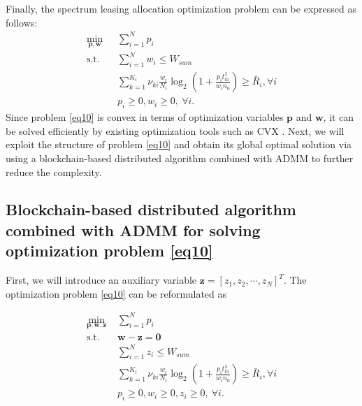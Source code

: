 \documentclass[journal]{IEEEtran}
\begin{document}
Finally, the spectrum leasing allocation optimization problem can be expressed as follows:
\begin{subequations}\label{eq10}
	\begin{align}
	\min_{\mathbf{p}, \mathbf{w}}\ & \sum\limits_{i = 1}^{N} p_i \label{q10a} \\ \mbox{s.t.} \quad &  \sum\limits_{i = 1}^{N} w_i \leq W_{sum} \label{q10b} \\ \quad &  \sum\limits_{k = 1}^{K_i}\nu_{ki}\frac{w_i}{N_i}\log_2\left(1 + \frac{p_it_{ki}^2}{w_in_0}\right) \geq \bar{R}_i, \forall i \label{q10c}\\
	& p_i \geq 0, w_i \geq 0, \ \forall i. \label{q10d}
	\end{align}
\end{subequations}
Since problem \eqref{eq10} is convex in terms of optimization variables $\mathbf{p}$ and $\mathbf{w}$, it can be solved efficiently by existing optimization tools such as CVX \cite{SBoyd1}. Next, we will exploit the structure of problem \eqref{eq10} and obtain its global optimal solution via using a blockchain-based distributed algorithm combined with ADMM \cite{SBoyd2,EChen} to further reduce the complexity.
\subsection{Blockchain-based distributed algorithm combined with ADMM for solving optimization problem \eqref{eq10}}
First, we will introduce an auxiliary variable $\mathbf{z} = \left[z_1, z_2, \cdots, z_N\right]^T$. The optimization problem \eqref{eq10} can be reformulated as

\begin{subequations}\label{eq11}
	\begin{align}
	\min_{\mathbf{p}, \mathbf{w}, \mathbf{z}}\ & \sum\limits_{i = 1}^{N} p_i \label{q11a} \\ \mbox{s.t.} \quad &  \mathbf{w} - \mathbf{z} = \mathbf{0} \label{q11b} \\ \quad &  \sum\limits_{i = 1}^{N}z_i \leq W_{sum} \label{q11c} \\ \quad &  \sum\limits_{k = 1}^{K_i}\nu_{ki}\frac{w_i}{N_i}\log_2\left(1 + \frac{p_it_{ki}^2}{w_in_0}\right) \geq \bar{R}_i, \forall i \label{q11d}\\
	& p_i \geq 0, w_i \geq 0, z_i \geq 0, \ \forall i. \label{q11e}
	\end{align}
\end{subequations}
\end{document}
